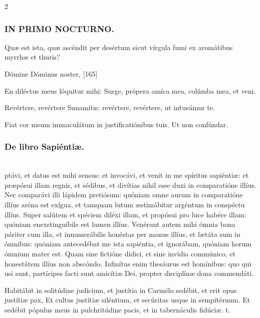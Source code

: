 \documentclass[9pt,twoside]{extarticle}
\begin{document}
\begin{multicols}{2}
\subsubsection*{\center \textsc{IN PRIMO NOCTURNO.}}
\begin{tightlist}{}
\item {} Quæ est ista, quæ ascéndit per desértum sicut vírgula fumi ex aromátibus myrrhæ et thuris?
\item {} Dómine Dóminus noster,  [165]
\item {} En diléctus meus lóquitur mihi: Surge, própera amíca mea, colúmba mea, et veni.
\item {} Revértere, revértere Sunamítis: revértere, revértere, ut intueámur te.
\item {} Fiat cor meum immaculátum in justificatiónibus tuis.  Ut non confúndar.
\item {}
\end{tightlist}

\subsubsection*{\center De libro Sapiéntiæ.}
 \hfill {}\\
ptávi, et datus est mihi sensus: et invocávi, et venit in me spíritus sapiéntiæ: et præpósui illam regnis, et sédibus, et divítias nihil esse duxi in comparatióne illíus. Nec comparávi illi lápidem pretiósum: quóniam omne aurum in comparatióne illíus aréna est exígua, et tamquam lutum æstimábitur argéntum in conspéctu illíus. Super salútem et spéciem diléxi illam, et propósui pro luce habére illam: quóniam enexstinguíbile est lumen illíus. Venérunt autem mihi ómnia bona páriter cum illa, et innumerábilis honéstas per manus illíus, et lætáta sum in ómnibus: quóniam antecedébat me ista sapiéntia, et ignorábam, quóniam horum ómnium mater est. Quam sine fictióne dídici, et sine invídia commúnico, et honestátem illíus non abscóndo. Infinítus enim thesáurus est homínibus: quo qui usi sunt, partícipes facti sunt amicítiæ Dei, propter disciplínæ dona commendáti.

\begin{tightlist}{}
\item {} Habitábit in solitúdine judícium, et justítia in Carmélo sedébit, et erit opus justítiæ pax, \textred{*} Et cultus justítiæ siléntium, et secúritas usque in sempitérnum.  Et sedébit pópulus meus in pulchritúdine pacis, et in tabernáculis fidúciæ. t.
\end{tightlist}


\end{multicols}
\end{document}
